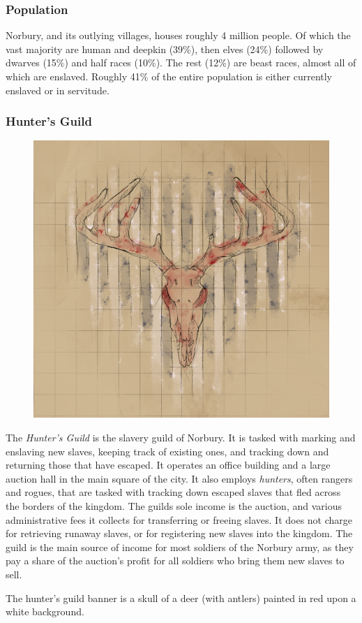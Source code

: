 \subsubsection*{Population}

Norbury, and its outlying villages, houses roughly 4 million people. Of which
the vast majority are human and deepkin (39\%), then elves (24\%) followed by
dwarves (15\%) and half races (10\%). The rest (12\%) are beast races, almost
all of which are enslaved. Roughly 41\% of the entire population is either
currently enslaved or in servitude.

\subsubsection*{Hunter's Guild}
\label{sec:Hunters Guild}

\begin{figure}[!ht]
  \centering
  \includegraphics[width=0.9\linewidth]{media/norbury-huntersguildsm.png}
\end{figure}

The \emph{Hunter's Guild} is the slavery guild of Norbury. It is tasked with
marking and enslaving new slaves, keeping track of existing ones, and tracking
down and returning those that have escaped. It operates an office building and
a large auction hall in the main square of the city. It also employs
\emph{hunters}, often rangers and rogues, that are tasked with tracking down
escaped slaves that fled across the borders of the kingdom. The guilds sole
income is the auction, and various administrative fees it collects for
transferring or freeing slaves. It does not charge for retrieving runaway
slaves, or for registering new slaves into the kingdom. The guild is the main
source of income for most soldiers of the Norbury army, as they pay a share of
the auction's profit for all soldiers who bring them new slaves to sell.

The hunter's guild banner is a skull of a deer (with antlers) painted in red
upon a white background.
